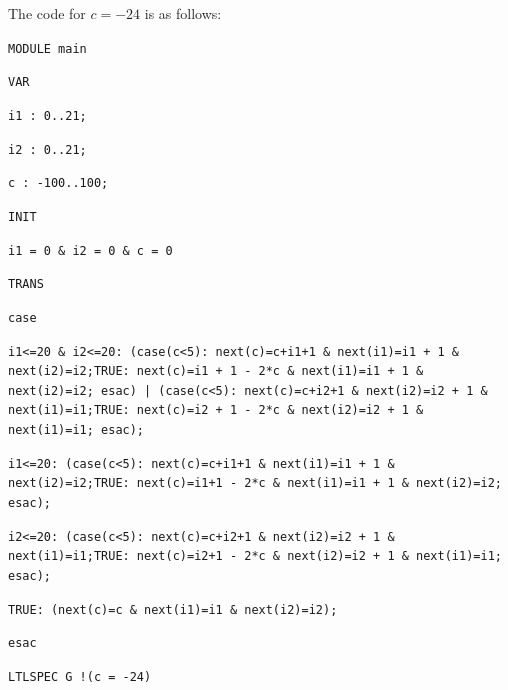 \documentclass[12pt]{article}
\begin{document}
The code for $c= -24$ is as follows:
{\footnotesize

{\tt MODULE main }

{\tt VAR }

{\tt i1 :  0..21; }

{\tt i2 :  0..21; }

{\tt c :  -100..100; }

{\tt INIT }

{\tt i1 = 0 \& i2 = 0 \& c = 0 }

{\tt TRANS }

{\tt case  }

{\tt i1<=20 \& i2<=20: (case(c<5): next(c)=c+i1+1 \& next(i1)=i1 + 1 \& next(i2)=i2;TRUE: next(c)=i1 + 1 - 2*c \& next(i1)=i1 + 1 \& next(i2)=i2; esac) | (case(c<5): next(c)=c+i2+1 \& next(i2)=i2 + 1 \& next(i1)=i1;TRUE: next(c)=i2 + 1 - 2*c \& next(i2)=i2 + 1 \& next(i1)=i1; esac); }

{\tt i1<=20: (case(c<5): next(c)=c+i1+1 \& next(i1)=i1 + 1 \& next(i2)=i2;TRUE: next(c)=i1+1 - 2*c \& next(i1)=i1 + 1 \& next(i2)=i2; esac); }

{\tt i2<=20: (case(c<5): next(c)=c+i2+1 \& next(i2)=i2 + 1 \& next(i1)=i1;TRUE: next(c)=i2+1 - 2*c \& next(i2)=i2 + 1 \& next(i1)=i1; esac); }

{\tt TRUE: (next(c)=c \& next(i1)=i1 \& next(i2)=i2); }

{\tt esac  }

{\tt LTLSPEC G !(c = -24) }	
}
\end{document}
